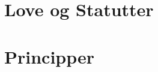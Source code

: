 \documentclass[a4paper,danish]{article}
\begin{document}
\tableofcontents
\newpage

\newpage
\part{Love og Statutter}



\newpage
\part{Principper}







\end{document}
